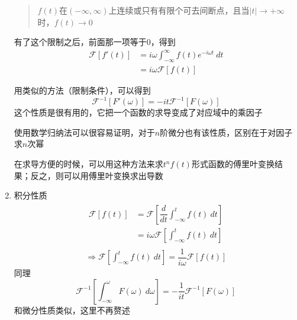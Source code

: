 \begin{enumerate}
                \begin{quote}
                    $f(t)$在$(-\infty, \infty)$上连续或只有有限个可去间断点，且当$|t|\to +\infty$时，$f(t)\to 0$
                \end{quote}
    
                有了这个限制之后，前面那一项等于0，得到
                \begin{equation}
                    \begin{split}
                    \mathscr{F}[f'(t)]&=i\omega\int_{-\infty}^{\infty}f(t)e^{-i\omega t}\ dt\\
                    &=i\omega\mathscr{F}[f(t)]
                    \end{split}
                    \label{eq: 1.21}
                \end{equation}
    
                用类似的方法（限制条件），可以得到
                \begin{equation}
                    \mathscr{F}^{-1}[F'(\omega)]=-it\mathscr{F}^{-1}[F(\omega)]
                    \label{eq: 1.22}
                \end{equation}
                这个性质是很有用的，它把一个函数的求导变成了对应域中的乘因子
    
                使用数学归纳法可以很容易证明，对于$n$阶微分也有该性质，区别在于对因子求$n$次幂
    
                在求导方便的时候，可以用这种方法来求$t^nf(t)$形式函数的傅里叶变换结果；反之，则可以用傅里叶变换求出导数

            \item{积分性质}
                \begin{equation}
                    \begin{split}
                        \begin{split}
                        \mathscr{F}[f(t)]&=\mathscr{F}[\dfrac{d}{dt}\int_{-\infty}^tf(t)\ dt]\\
                        &= i\omega\mathscr{F}[\int_{-\infty}^tf(t)\ dt]
                        \end{split}\\
                        \Rightarrow\mathscr{F}[\int_{-\infty}^tf(t)\ dt]=\dfrac{1}{i\omega}\mathscr{F}[f(t)]
                    \end{split}
                    \label{eq: 1.23}
                \end{equation}
                同理
                \begin{equation}
                    \mathscr{F}^{-1}[\int_{-\infty}^\omega F(\omega)\ d\omega]=-\dfrac{1}{it}\mathscr{F}^{-1}[F(\omega)]
                    \label{eq: 1.24}
                \end{equation}
                和微分性质类似，这里不再赘述


\end{enumerate}
